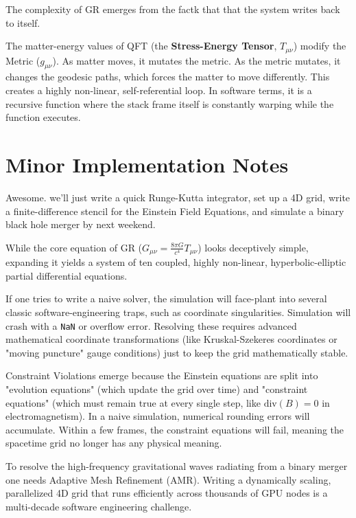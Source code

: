 The complexity of GR emerges from the factk that that the system writes back to itself. 

The matter-energy values of QFT (the \textbf{Stress-Energy Tensor}, $T_{\mu\nu}$) modify the Metric ($g_{\mu\nu}$).
As matter moves, it mutates the metric.
As the metric mutates, it changes the geodesic paths, which forces the matter to move differently.
This creates a highly non-linear, self-referential loop.
In software terms, it is a recursive function where the stack frame itself is constantly warping while the function executes.



\section{Minor Implementation Notes}

Awesome. we'll just write a quick Runge-Kutta integrator, set up a 4D grid, write a finite-difference stencil for the Einstein Field Equations, and simulate a binary black hole merger by next weekend.

While the core equation of GR ($G_{\mu\nu} = \frac{8\pi G}{c^4} T_{\mu\nu}$) looks deceptively simple, expanding it yields a system of ten coupled, highly non-linear, hyperbolic-elliptic partial differential equations.

If one tries to write a naive solver, the simulation will face-plant into several classic software-engineering traps, such as coordinate singularities.
Simulation will crash with a \texttt{NaN} or overflow error. Resolving these requires advanced mathematical coordinate transformations (like Kruskal-Szekeres coordinates or "moving puncture" gauge conditions) just to keep the grid mathematically stable.

Constraint Violations emerge because the Einstein equations are split into "evolution equations" (which update the grid over time) and "constraint equations" (which must remain true at every single step, like $\text{div}(B) = 0$ in electromagnetism).
In a naive simulation, numerical rounding errors will accumulate.  Within a few frames, the constraint equations will fail, meaning the spacetime grid no longer has any physical meaning.

To resolve the high-frequency gravitational waves radiating from a binary merger one needs Adaptive Mesh Refinement (AMR).
Writing a dynamically scaling, parallelized 4D grid that runs efficiently across thousands of GPU nodes is a multi-decade software engineering challenge.

